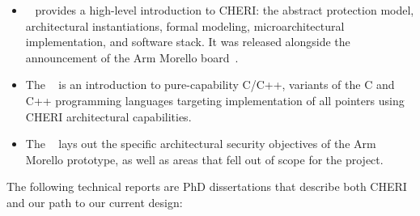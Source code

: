 \begin{itemize}
\item {}~\cite{UCAM-CL-TR-941} provides a
  high-level introduction to CHERI: the abstract protection model,
  architectural instantiations, formal modeling, microarchitectural
  implementation, and software stack.
  It was released alongside the announcement of the Arm Morello
  board~\cite{arm-morello}.

\item The ~\cite{UCAM-CL-TR-947} is an
  introduction to pure-capability C/C++, variants of the C and C++ programming
  languages targeting implementation of all pointers using CHERI architectural
  capabilities.

\item The ~\cite{UCAM-CL-TR-982} lays out the
  specific architectural security objectives of the Arm Morello prototype,
  as well as areas that fell out of scope for the project.
\end{itemize}

The following technical reports are PhD dissertations that describe both CHERI
and our path to our current design:

